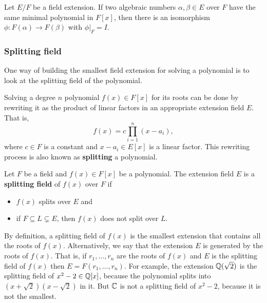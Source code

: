 \documentclass[../main.tex]{subfiles}
\begin{document}
\begin{corollary}
Let $E/F$ be a field extension. If two algebraic numbers $\alpha, \beta \in E$ over $F$ have the same minimal polynomial in $F[x]$, then there is an isomorphism $\phi: F(\alpha) \rightarrow F(\beta)$ with $\phi |_F = I$.
\end{corollary}


\subsubsection{Splitting field}

One way of building the smallest field extension for solving a polynomial is to look at the splitting field of the polynomial. 

Solving a degree $n$ polynomial $f(x) \in F[x]$ for its roots can be done by rewriting it as the product of linear factors in an appropriate extension field $E$. That is,  
\begin{equation*}
    f(x) = c \prod_{i=1}^n (x-a_i),
\end{equation*}
where $c \in F$ is a constant and $x-a_i \in E[x]$ is a linear factor. This rewriting process is also known as \textbf{splitting} a polynomial. %

\begin{definition}
Let $F$ be a field and $f(x) \in F[x]$ be a polynomial. The extension field $E$ is a \textbf{splitting field}\reversemarginpar
{} of $f(x)$ over $F$ if
\begin{itemize}
    \item $f(x)$ splits over $E$ and 
    \item if $F \subseteq L \subsetneq E$, then $f(x)$ does not split over $L$.
\end{itemize}
\end{definition}
By definition, a splitting field of $f(x)$ is the smallest extension that contains all the roots of $f(x)$. Alternatively, we say that the extension $E$ is generated by the roots of $f(x)$. That is, if $r_1, \ldots,r_n$ are the roots of $f(x)$ and $E$ is the splitting field of $f(x)$ then $E = F(r_1, \ldots, r_n)$. For example, the extension $\mathbb{Q}(\sqrt{2})$ is the splitting field of $x^2-2 \in \mathbb{Q}[x]$, because the polynomial splits into $(x+\sqrt{2})(x-\sqrt{2})$ in it. But $\mathbb{C}$ is not a splitting field of $x^2-2$, because it is not the smallest. 
\end{document}
